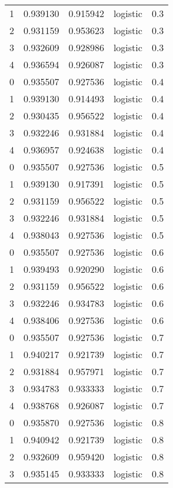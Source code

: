 \begin{tabular}{rrrlr}
     1 & 0.939130 & 0.915942 & logistic &        0.3 \\
     2 & 0.931159 & 0.953623 & logistic &        0.3 \\
     3 & 0.932609 & 0.928986 & logistic &        0.3 \\
     4 & 0.936594 & 0.926087 & logistic &        0.3 \\
     0 & 0.935507 & 0.927536 & logistic &        0.4 \\
     1 & 0.939130 & 0.914493 & logistic &        0.4 \\
     2 & 0.930435 & 0.956522 & logistic &        0.4 \\
     3 & 0.932246 & 0.931884 & logistic &        0.4 \\
     4 & 0.936957 & 0.924638 & logistic &        0.4 \\
     0 & 0.935507 & 0.927536 & logistic &        0.5 \\
     1 & 0.939130 & 0.917391 & logistic &        0.5 \\
     2 & 0.931159 & 0.956522 & logistic &        0.5 \\
     3 & 0.932246 & 0.931884 & logistic &        0.5 \\
     4 & 0.938043 & 0.927536 & logistic &        0.5 \\
     0 & 0.935507 & 0.927536 & logistic &        0.6 \\
     1 & 0.939493 & 0.920290 & logistic &        0.6 \\
     2 & 0.931159 & 0.956522 & logistic &        0.6 \\
     3 & 0.932246 & 0.934783 & logistic &        0.6 \\
     4 & 0.938406 & 0.927536 & logistic &        0.6 \\
     0 & 0.935507 & 0.927536 & logistic &        0.7 \\
     1 & 0.940217 & 0.921739 & logistic &        0.7 \\
     2 & 0.931884 & 0.957971 & logistic &        0.7 \\
     3 & 0.934783 & 0.933333 & logistic &        0.7 \\
     4 & 0.938768 & 0.926087 & logistic &        0.7 \\
     0 & 0.935870 & 0.927536 & logistic &        0.8 \\
     1 & 0.940942 & 0.921739 & logistic &        0.8 \\
     2 & 0.932609 & 0.959420 & logistic &        0.8 \\
     3 & 0.935145 & 0.933333 & logistic &        0.8 \\

\end{tabular}
